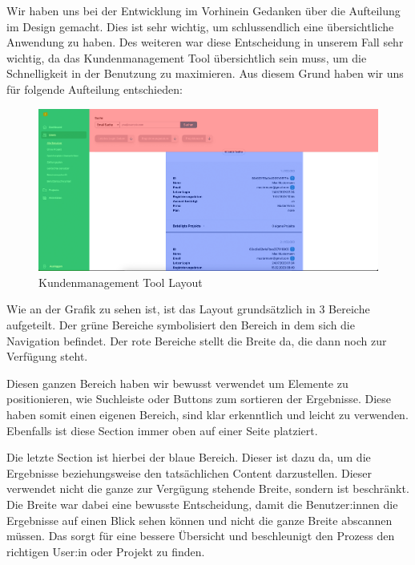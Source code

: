 Wir haben uns bei der Entwicklung im Vorhinein Gedanken über die Aufteilung im Design gemacht. Dies ist sehr wichtig, um schlussendlich eine übersichtliche Anwendung zu haben. Des weiteren war diese Entscheidung in unserem Fall sehr wichtig, da das Kundenmanagement Tool übersichtlich sein muss, um die Schnelligkeit in der Benutzung zu maximieren.
Aus diesem Grund haben wir uns für folgende Aufteilung entschieden:

\begin{figure}[h!]
    \centering
    \includegraphics[width=1\textwidth]{pics/planfred-grids.png}
    \caption{Kundenmanagement Tool Layout}
    \label{fig:mesh1}
\end{figure}

Wie an der Grafik zu sehen ist, ist das Layout grundsätzlich in 3 Bereiche aufgeteilt. Der grüne Bereiche symbolisiert den Bereich in dem sich die Navigation befindet. Der rote Bereiche stellt die Breite da, die dann noch zur Verfügung steht.

Diesen ganzen Bereich haben wir bewusst verwendet um Elemente zu positionieren, wie Suchleiste oder Buttons zum sortieren der Ergebnisse. Diese haben somit einen eigenen Bereich, sind klar erkenntlich und leicht zu verwenden. Ebenfalls ist diese Section immer oben auf einer Seite platziert.

Die letzte Section ist hierbei der blaue Bereich. Dieser ist dazu da, um die Ergebnisse beziehungsweise den tatsächlichen Content darzustellen. Dieser verwendet nicht die ganze zur Vergügung stehende Breite, sondern ist beschränkt. Die Breite war dabei eine bewusste Entscheidung, damit die Benutzer:innen die Ergebnisse auf einen Blick sehen können und nicht die ganze Breite abscannen müssen. Das sorgt für eine bessere Übersicht und beschleunigt den Prozess den richtigen User:in oder Projekt zu finden.

